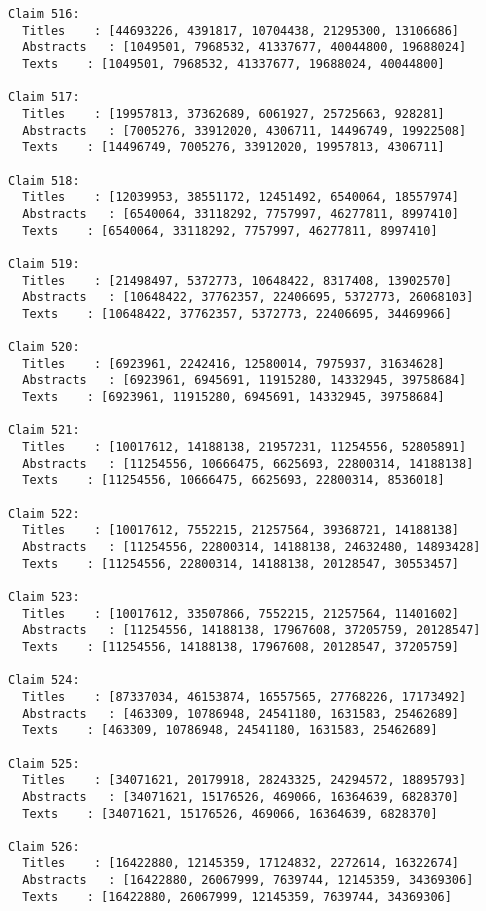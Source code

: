 \documentclass[11pt]{article}
\begin{document}
\begin{Verbatim}[commandchars=\\\{\}]
Claim 516:
  Titles    : [44693226, 4391817, 10704438, 21295300, 13106686]
  Abstracts   : [1049501, 7968532, 41337677, 40044800, 19688024]
  Texts    : [1049501, 7968532, 41337677, 19688024, 40044800]

Claim 517:
  Titles    : [19957813, 37362689, 6061927, 25725663, 928281]
  Abstracts   : [7005276, 33912020, 4306711, 14496749, 19922508]
  Texts    : [14496749, 7005276, 33912020, 19957813, 4306711]

Claim 518:
  Titles    : [12039953, 38551172, 12451492, 6540064, 18557974]
  Abstracts   : [6540064, 33118292, 7757997, 46277811, 8997410]
  Texts    : [6540064, 33118292, 7757997, 46277811, 8997410]

Claim 519:
  Titles    : [21498497, 5372773, 10648422, 8317408, 13902570]
  Abstracts   : [10648422, 37762357, 22406695, 5372773, 26068103]
  Texts    : [10648422, 37762357, 5372773, 22406695, 34469966]

Claim 520:
  Titles    : [6923961, 2242416, 12580014, 7975937, 31634628]
  Abstracts   : [6923961, 6945691, 11915280, 14332945, 39758684]
  Texts    : [6923961, 11915280, 6945691, 14332945, 39758684]

Claim 521:
  Titles    : [10017612, 14188138, 21957231, 11254556, 52805891]
  Abstracts   : [11254556, 10666475, 6625693, 22800314, 14188138]
  Texts    : [11254556, 10666475, 6625693, 22800314, 8536018]

Claim 522:
  Titles    : [10017612, 7552215, 21257564, 39368721, 14188138]
  Abstracts   : [11254556, 22800314, 14188138, 24632480, 14893428]
  Texts    : [11254556, 22800314, 14188138, 20128547, 30553457]

Claim 523:
  Titles    : [10017612, 33507866, 7552215, 21257564, 11401602]
  Abstracts   : [11254556, 14188138, 17967608, 37205759, 20128547]
  Texts    : [11254556, 14188138, 17967608, 20128547, 37205759]

Claim 524:
  Titles    : [87337034, 46153874, 16557565, 27768226, 17173492]
  Abstracts   : [463309, 10786948, 24541180, 1631583, 25462689]
  Texts    : [463309, 10786948, 24541180, 1631583, 25462689]

Claim 525:
  Titles    : [34071621, 20179918, 28243325, 24294572, 18895793]
  Abstracts   : [34071621, 15176526, 469066, 16364639, 6828370]
  Texts    : [34071621, 15176526, 469066, 16364639, 6828370]

Claim 526:
  Titles    : [16422880, 12145359, 17124832, 2272614, 16322674]
  Abstracts   : [16422880, 26067999, 7639744, 12145359, 34369306]
  Texts    : [16422880, 26067999, 12145359, 7639744, 34369306]


\end{Verbatim}
\end{document}
